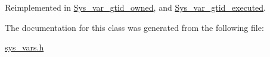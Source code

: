Reimplemented in \mbox{\hyperlink{classSys__var__gtid__owned_a4eca8f703243a9e215184dd32b7bc2cf}{Sys\+\_\+var\+\_\+gtid\+\_\+owned}}, and \mbox{\hyperlink{classSys__var__gtid__executed_a0dda7c15486b8024efc6feb4146b6b7e}{Sys\+\_\+var\+\_\+gtid\+\_\+executed}}.



The documentation for this class was generated from the following file\+:\begin{DoxyCompactItemize}
\item 
\mbox{\hyperlink{sys__vars_8h}{sys\+\_\+vars.\+h}}\end{DoxyCompactItemize}
